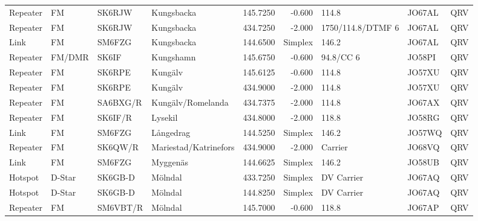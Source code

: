 \begin{landscape}
\begin{longtable}{llllrrlll}
	Repeater          & FM              & SK6RJW   & Kungsbacka            &     145.7250 &     -0.600 & 114.8             & JO67AL      & QRV      \\
	Repeater          & FM              & SK6RJW   & Kungsbacka            &     434.7250 &     -2.000 & 1750/114.8/DTMF 6 & JO67AL      & QRV      \\
	Link              & FM              & SM6FZG   & Kungsbacka            &     144.6500 &    Simplex & 146.2             & JO67AL      & QRV      \\
	Repeater          & FM/DMR          & SK6IF    & Kungshamn             &     145.6750 &     -0.600 & 94.8/CC 6         & JO58PI      & QRV      \\
	Repeater          & FM              & SK6RPE   & Kungälv               &     145.6125 &     -0.600 & 114.8             & JO57XU      & QRV      \\
	Repeater          & FM              & SK6RPE   & Kungälv               &     434.9000 &     -2.000 & 114.8             & JO57XU      & QRV      \\
	Repeater          & FM              & SA6BXG/R & Kungälv/Romelanda     &     434.7375 &     -2.000 & 114.8             & JO67AX      & QRV      \\
	Repeater          & FM              & SK6IF/R  & Lysekil               &     434.8000 &     -2.000 & 118.8             & JO58RG      & QRV      \\
	Link              & FM              & SM6FZG   & Långedrag             &     144.5250 &    Simplex & 146.2             & JO57WQ      & QRV      \\
	Repeater          & FM              & SK6QW/R  & Mariestad/Katrinefors &     434.9000 &     -2.000 & Carrier           & JO68VQ      & QRV      \\
	Link              & FM              & SM6FZG   & Myggenäs              &     144.6625 &    Simplex & 146.2             & JO58UB      & QRV      \\
	Hotspot           & D-Star          & SK6GB-D  & Mölndal               &     433.7250 &    Simplex & DV Carrier        & JO67AQ      & QRV      \\
	Hotspot           & D-Star          & SK6GB-D  & Mölndal               &     144.8250 &    Simplex & DV Carrier        & JO67AQ      & QRV      \\
	Repeater          & FM              & SM6VBT/R & Mölndal               &     145.7000 &     -0.600 & 118.8             & JO67AP      & QRV      \\

\end{longtable}
\end{landscape}
